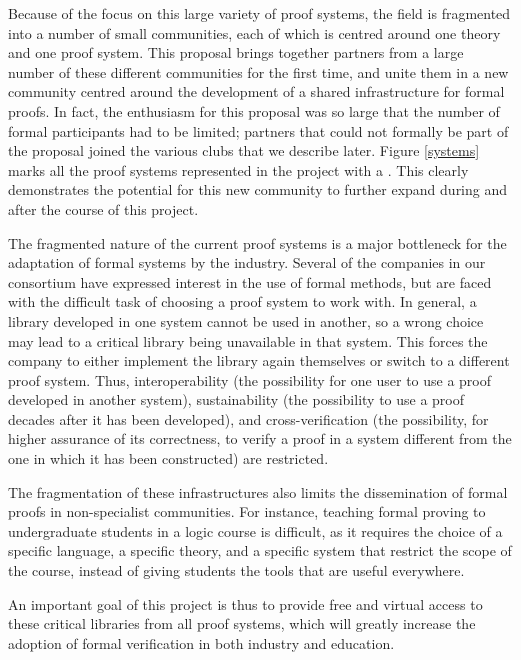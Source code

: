 Because of the focus on this large variety of proof systems, the field
is fragmented into a number of small communities, each of which is
centred around one theory and one proof system. This proposal brings
together partners from a large number of these different communities
for the first time, and unite them in a new community
centred around the development of a shared infrastructure for formal
proofs.  In fact, the enthusiasm for this proposal was so large that the number
of formal participants had to be limited; partners that could not
formally be part of the proposal joined the various clubs that we
describe later.  Figure
\ref{systems} marks all the proof systems represented in the project
with a \s. This clearly demonstrates the potential for this new
community to further expand during and after the course of this project.

The fragmented nature of the current proof systems is a major
bottleneck for the adaptation of formal systems by the
industry. Several of the companies in our consortium have expressed
interest in the use of formal methods, but are faced with the
difficult task of choosing a proof system to work with. In general, a
library developed in one system cannot be used in another, so a wrong
choice may lead to a critical library being unavailable in that
system. This forces the company to either implement the library again
themselves or switch to a different proof system.  Thus,
interoperability (the possibility for one user to use a proof
developed in another system), sustainability (the possibility to use a
proof decades after it has been developed), and cross-verification
(the possibility, for higher assurance of its correctness, to verify a
proof in a system different from the one in which it has been constructed) are restricted.

The fragmentation of these infrastructures also limits the
dissemination of formal proofs in non-specialist communities. For
instance, teaching formal proving to undergraduate students in a logic
course is difficult, as it requires the choice of a specific language,
a specific theory, and a specific system that restrict the scope of the
course, instead of giving students the tools that are useful
everywhere. 

An important goal of this project is thus to provide free and virtual
access to these critical libraries from all proof systems,
which will greatly increase the adoption of formal verification in
both industry and education.

